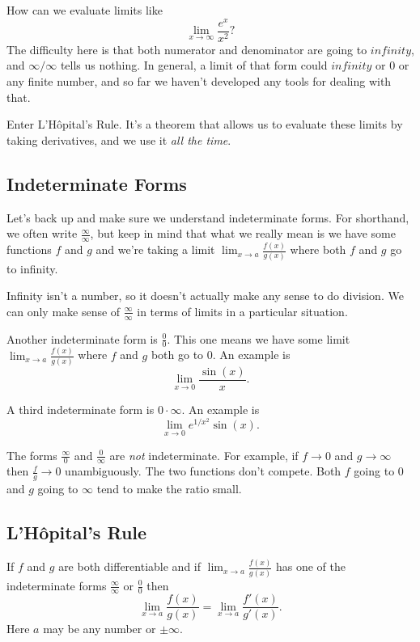 \documentclass[11pt]{book}
\newcounter{error}[chapter]
\numberwithin{example}{chapter}
\begin{document}
How can we evaluate limits like 
$$\lim_{x\to \infty} \frac{e^x}{x^2}?$$
The difficulty here is that both numerator and denominator are going to $infinity$, and $\infty/\infty$ tells us nothing.  In general, a limit of that form could $infinity$ or 0 or any finite number, and so far we haven't developed any tools for dealing with that.  


Enter L'H\^{o}pital's Rule.  It's a theorem that allows us to evaluate these limits by taking derivatives, and we use it \emph{all the time}.  

\subsection{Indeterminate Forms}

Let's back up and make sure we understand indeterminate forms.  For shorthand, we often write $\frac{\infty}{\infty}$, but keep in mind that what we really mean is we have some functions $f$ and $g$ and we're taking a limit $\lim_{x\to a}\frac{f(x)}{g(x)}$ where both $f$ and $g$ go to infinity.

Infinity isn't a number, so it doesn't actually make any sense to do division.  We can only make sense of $\frac{\infty}{\infty}$ in terms of limits in a particular situation.

Another indeterminate form is $\frac{0}{0}$.  This one means we have some limit  $\lim_{x\to a}\frac{f(x)}{g(x)}$ where $f$ and $g$ both go to 0.  An example is $$\lim_{x\to 0}\frac{\sin(x)}{x}.$$

A third indeterminate form is $0\cdot \infty$.  An example is 
$$\lim_{x\to 0}e^{1/x^2}\sin(x).$$


\begin{error}
The forms $\frac{\infty}{0}$ and $\frac{0}{\infty}$ are \emph{not} indeterminate.  For example, if $f\to 0$ and $g\to \infty$ then $\frac{f}{g}\to 0$ unambiguously.  The two functions don't compete.  Both $f$ going to 0 and $g$ going to $\infty$ tend to make the ratio small.
\end{error}

\subsection{L'H\^{o}pital's Rule}


\begin{theorem}
If $f$ and $g$ are both differentiable and if $\lim_{x\to a} \frac{f(x)}{g(x)}$ has one of the indeterminate forms $\frac{\infty}{\infty}$ or $\frac{0}{0}$ then 
$$\lim_{x\to a} \frac{f(x)}{g(x)} = \lim_{x\to a} \frac{f'(x)}{g'(x)}.$$
Here $a$ may be any number or $\pm\infty$.
\end{theorem}
\end{document}
